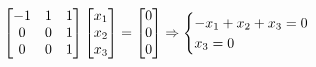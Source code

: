 \documentclass[preview]{standalone}
\begin{document}
\begin{align*}
\special{dvisvgm:raw <g id='unique000'>}\begin{bmatrix} -1 & 1 & 1 \\ 0 & 0 & 1 \\ 0 & 0 & 1 \end{bmatrix} \begin{bmatrix} x_1 \\ x_2 \\ x_3 \end{bmatrix} = \begin{bmatrix} 0 \\ 0 \\ 0 \end{bmatrix} \Rightarrow \begin{cases} -x_1 + x_2 + x_3 = 0 \\ x_3 = 0 \end{cases}\special{dvisvgm:raw </g>}
\end{align*}
\end{document}
